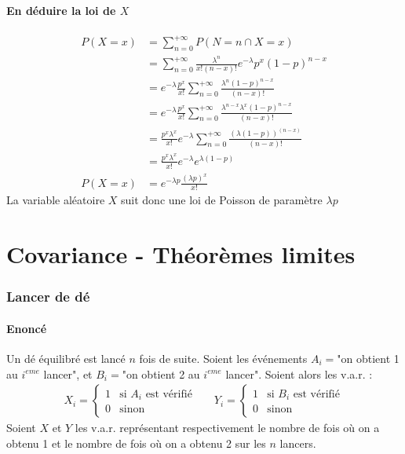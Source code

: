 \documentclass[10pt,a4paper,twoside]{article}
\begin{document}
\subsection{En déduire la loi de $X$}
\begin{align*}
P(X=x) &= \sum_{n=0}^{+\infty} P(N=n \cap X=x)\\
&= \sum_{n=0}^{+\infty} \frac{\lambda^{n}}{x!(n-x)!}e^{-\lambda} p^{x} (1-p)^{n-x}\\
&= e^{-\lambda}\frac{p^{x}}{x!} \sum_{n=0}^{+\infty} \frac{\lambda^{n} (1-p)^{n-x}}{(n-x)!}\\
&= e^{-\lambda}\frac{p^{x}}{x!} \sum_{n=0}^{+\infty} \frac{\lambda^{n-x} \lambda^{x} (1-p)^{n-x}}{(n-x)!}\\
&= \frac{p^{x}\lambda^{x}}{x!} e^{-\lambda} \sum_{n=0}^{+\infty} \frac{(\lambda (1-p))^{(n-x)}}{(n-x)!}\\
&= \frac{p^{x}\lambda^{x}}{x!} e^{-\lambda} e^{\lambda(1-p)}\\
P(X=x) &= e^{-\lambda p} \frac{(\lambda p)^{x}}{x!}
\end{align*}
La variable aléatoire $X$ suit donc une loi de Poisson de paramètre $\lambda p$

\newpage
\part{Covariance - Théorèmes limites}
\setcounter{section}{0}
\section{Lancer de dé}
\subsection*{Enoncé}
Un dé équilibré est lancé $n$ fois de suite. Soient les événements $A_{i}=$"on obtient 1 au $i^{eme}$ lancer", et $B_{i}=$"on obtient 2 au $i^{eme}$ lancer". Soient alors les v.a.r. :
\begin{align*}
X_{i} = \left\lbrace \begin{array}{ll}
1 & \text{si }A_{i}\text{ est vérifié}\\
0 & \text{sinon}
\end{array}\right.
&&
Y_{i} = \left\lbrace \begin{array}{ll}
1 & \text{si }B_{i}\text{ est vérifié}\\
0 & \text{sinon}
\end{array}\right.
\end{align*} 
Soient $X$ et $Y$ les v.a.r. représentant respectivement le nombre de fois où on a obtenu 1 et le nombre de fois où on a obtenu 2 sur les $n$ lancers.
\end{document}
